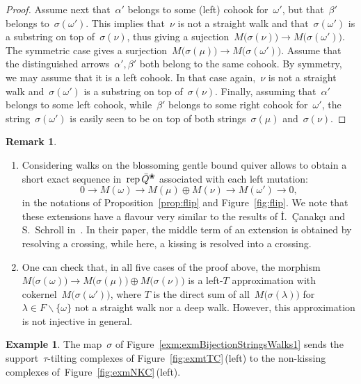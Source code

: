 \documentclass{amsart}
\theoremstyle{definition}
\newtheorem{example}[theorem]{Example}
\newtheorem{remark}[theorem]{Remark}
\newcommand{\ssm}{\smallsetminus} %
\newcommand{\fref}[1]{Figure~\ref{#1}} %
\newcommand{\blossom}{^\text{\ding{96}}} %
\newcommand{\rep}{\operatorname{{\rm rep}}}
\begin{document}
\begin{proof}
Assume next that~$\alpha'$ belongs to some (left) cohook for~$\omega'$, but that~$\beta'$ belongs to~$\sigma(\omega')$.
This implies that~$\nu$ is not a straight walk and that~$\sigma(\omega')$ is a substring on top of~$\sigma(\nu)$, thus giving a sujection~$M \big( \sigma(\nu) \big) \rightarrow M \big( \sigma(\omega') \big)$.
The symmetric case gives a surjection~$M \big( \sigma(\mu) \big) \rightarrow M \big( \sigma(\omega') \big)$.
Assume that the distinguished arrows~$\alpha', \beta'$ both belong to the same cohook.
By symmetry, we may assume that it is a left cohook.
In that case again,~$\nu$ is not a straight walk and~$\sigma(\omega')$ is a substring on top of~$\sigma(\nu)$.
Finally, assuming that~$\alpha'$ belongs to some left cohook, while~$\beta'$ belongs to some right cohook for~$\omega'$, the string~$\sigma(\omega')$ is easily seen to be on top of both strings~$\sigma(\mu)$ and~$\sigma(\nu)$.
\end{proof}


\begin{remark}
\begin{enumerate}
\item Considering walks on the blossoming gentle bound quiver allows to obtain a short exact sequence in~$\rep \bar Q\blossom$ associated with each left mutation:
\[
0\rightarrow M(\omega) \rightarrow M(\mu) \oplus M(\nu) \rightarrow M(\omega') \rightarrow 0,
\]
in the notations of Proposition~\ref{prop:flip} and Figure~\ref{fig:flip}.
We note that these extensions have a flavour very similar to the results of  \.{I}.~\c{C}anak\c{c}{\i} and S.~Schroll in~\cite{CanakciSchroll}.
In their paper, the middle term of an extension is obtained by resolving a crossing, while here, a kissing is resolved into a crossing.
\item One can check that, in all five cases of the proof above, the morphism $M \big( \sigma(\omega) \big) \rightarrow M \big( \sigma(\mu) \big) \oplus M \big( \sigma(\nu) \big)$ is a left-$T$ approximation with cokernel~$M \big( \sigma(\omega') \big)$, where $T$ is the direct sum of all~$M \big( \sigma(\lambda) \big)$ for $\lambda \in F \ssm \{\omega\}$ not a straight walk nor a deep walk.
 However, this approximation is not injective in general.
\end{enumerate}
\end{remark}


\begin{example}
The map~$\sigma$ of \fref{exm:exmBijectionStringsWalks1} sends the support~$\tau$-tilting complexes of \fref{fig:exmtTC}\,(left) to the non-kissing complexes of~\fref{fig:exmNKC}\,(left).
\end{example}
\end{document}

